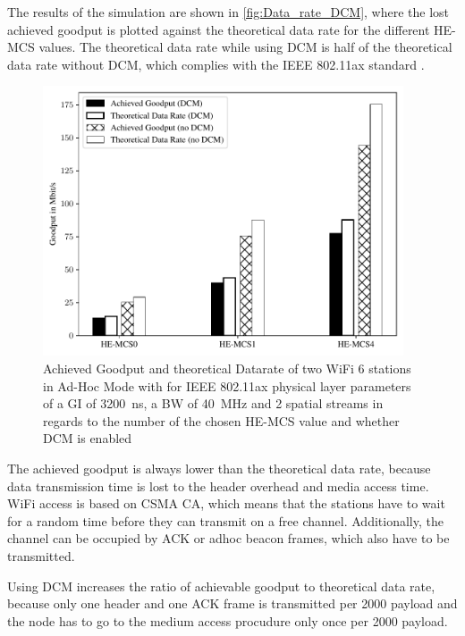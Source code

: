The results of the simulation are shown in \autoref{fig:Data_rate_DCM}, where the lost achieved goodput is plotted against
the theoretical data rate for the different HE-\ac{MCS} values. The theoretical data rate while using \ac{DCM} is half of the
theoretical data rate without \ac{DCM}, which complies with the IEEE 802.11ax standard \cite{noauthor_ieee_2021}.
\begin{figure}[H]%
	\centering
	\includegraphics[width=0.95\textwidth]{figures/DCM_dataRate_simulation.pdf}
	\caption{Achieved Goodput and theoretical Datarate of two WiFi 6 stations in Ad-Hoc Mode with for IEEE 802.11ax physical layer parameters of a \acf{GI} of \SI{3200}{\nano\second}, a \acf{BW} of \SI{40}{\mega\hertz} and 2 spatial streams  in regards to the number of the chosen HE-\acf{MCS} value and whether \acf{DCM} is enabled}%
	\label{fig:Data_rate_DCM}%
\end{figure}

The achieved goodput is always lower than the theoretical data rate, because data transmission time is lost to the header overhead and media access time.
WiFi access is based on CSMA CA, which means that the stations have to wait for a random time before they can transmit on a free channel.
Additionally, the channel can be occupied by ACK or adhoc beacon frames, which also have to be transmitted.

Using \ac{DCM} increases the ratio of achievable goodput to theoretical data rate, because only one header and one ACK frame is transmitted per
\SI{2000}{\byte} payload and the node has to go to the medium access procudure only once per \SI{2000}{\byte} payload.


